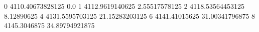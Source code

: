 0 4110.40673828125 0.0
1 4112.9619140625 2.55517578125
2 4118.53564453125 8.12890625
4 4131.5595703125 21.15283203125
6 4141.41015625 31.00341796875
8 4145.3046875 34.89794921875

